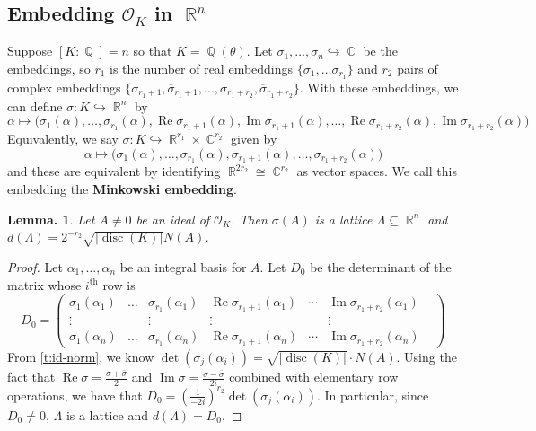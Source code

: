 \documentclass[11pt, a4paper]{memoir}
\DeclareMathOperator{\Q}{{\mathbb{Q}}}
\DeclareMathOperator{\R}{{\mathbb{R}}}
\DeclareMathOperator{\C}{{\mathbb{C}}}
\newcommand{\hto}[0]{\ensuremath{\hookrightarrow}}
\newcommand{\ol}[1]{\ensuremath{\overline{#1}}}
\theoremstyle{change}
\newtheorem{lemma}[theorem]{Lemma.}
\theoremstyle{plain}
\theoremstyle{nonumberplain}
\newtheorem{proof}{Proof}
\DeclareMathOperator{\disc}{disc}
\renewcommand{\Re}{\ensuremath{\operatorname{Re}}}
\renewcommand{\Im}{\ensuremath{\operatorname{Im}}}
\newcommand{\mbf}[1]{{\boldmath\bfseries #1}}
\numberwithin{equation}{section}
\begin{document}
\subsection{Embedding \texorpdfstring{$\mathcal{O}_K$}{OK} in $\R^n$}
Suppose $[K:\Q]=n$ so that $K=\Q(\theta)$.
Let $\sigma_1,\ldots,\sigma_n\hto\C$ be the embeddings, so $r_1$ is the number of real embeddings $\{\sigma_1,\ldots\sigma_{r_1}\}$ and $r_2$ pairs of complex embeddings $\{\sigma_{r_1+1},\ol{\sigma}_{r_1+1},\ldots,\sigma_{r_1+r_2},\ol{\sigma}_{r_1+r_2}\}$.
With these embeddings, we can define $\sigma:K\hto\R^n$ by
\begin{equation*}
    \alpha\mapsto\bigl(\sigma_1(\alpha),\ldots,\sigma_{r_1}(\alpha),\Re\sigma_{r_1+1}(\alpha),\Im\sigma_{r_1+1}(\alpha),\ldots,\Re\sigma_{r_1+r_2}(\alpha),\Im\sigma_{r_1+r_2}(\alpha)\bigr)
\end{equation*}
Equivalently, we say $\sigma:K\hto\R^{r_1}\times\C^{r_2}$ given by
\begin{equation*}
    \alpha\mapsto\bigl(\sigma_1(\alpha),\ldots,\sigma_{r_1}(\alpha),\sigma_{r_1+1}(\alpha),\ldots,\sigma_{r_1+r_2}(\alpha)\bigr)
\end{equation*}
and these are equivalent by identifying $\R^{2r_2}\cong\C^{r_2}$ as vector spaces.
We call this embedding the \mbf{Minkowski embedding}.
\begin{lemma}\label{l:lat-sz}
    Let $A\neq 0$ be an ideal of $\mathcal{O}_K$.
    Then $\sigma(A)$ is a lattice $\Lambda\subseteq\R^n$ and $d(\Lambda)=2^{-r_2}\sqrt{|\disc(K)|}N(A)$.
\end{lemma}
\begin{proof}
    Let $\alpha_1,\ldots,\alpha_n$ be an integral basis for $A$.
    Let $D_0$ be the determinant of the matrix whose $i^{\text{th}}$ row is
    \begin{equation*}
        D_0=
        \begin{pmatrix}
            \sigma_1(\alpha_1)&\ldots&\sigma_{r_1}(\alpha_1)&\Re\sigma_{r_1+1}(\alpha_1)&\cdots&\Im\sigma_{r_1+r_2}(\alpha_1)\\
            \vdots&&\vdots&\vdots&&\vdots&\\
            \sigma_1(\alpha_n)&\ldots&\sigma_{r_1}(\alpha_n)&\Re\sigma_{r_1+1}(\alpha_n)&\cdots&\Im\sigma_{r_1+r_2}(\alpha_n)
        \end{pmatrix}
    \end{equation*}
    From \cref{t:id-norm}, we know $\det(\sigma_j(\alpha_i))=\sqrt{|\disc(K)|}\cdot N(A)$.
    Using the fact that $\Re\sigma=\frac{\sigma+\ol{\sigma}}{2}$ and $\Im\sigma=\frac{\sigma-\ol{\sigma}}{2i}$ combined with elementary row operations, we have that $D_0=\left(\frac{1}{-2i}\right)^{r_2}\det(\sigma_j(\alpha_i))$.
    In particular, since $D_0\neq 0$, $\Lambda$ is a lattice and $d(\Lambda)=D_0$.
\end{proof}
\end{document}
